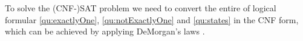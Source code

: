To solve the (CNF-)SAT problem we need to convert the entire of 
logical formular \ref*{qu:exactlyOne}, \ref*{qu:notExactlyOne} and \ref*{qu:states} in the CNF form, 
which can be achieved by applying DeMorgan's laws \cite{enwiki:1184283195}.





